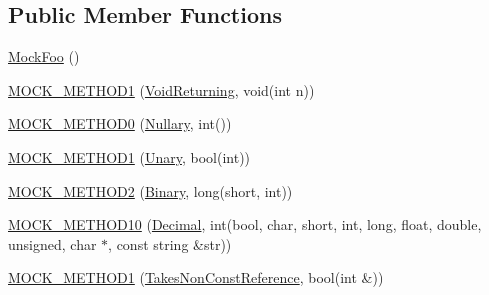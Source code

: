 \subsection*{Public Member Functions}
\begin{DoxyCompactItemize}
\item 
\hyperlink{classtesting_1_1gmock__generated__function__mockers__test_1_1_mock_foo_a05d4aeb00d75b5dbf627a5db2c0ada7f}{Mock\+Foo} ()
\item 
\hyperlink{classtesting_1_1gmock__generated__function__mockers__test_1_1_mock_foo_a03e7f723e9909b031fc6df22f41aac7f}{M\+O\+C\+K\+\_\+\+M\+E\+T\+H\+O\+D1} (\hyperlink{classtesting_1_1gmock__generated__function__mockers__test_1_1_foo_interface_adf968115cf1260004d8abe372dc71c85}{Void\+Returning}, void(int n))
\item 
\hyperlink{classtesting_1_1gmock__generated__function__mockers__test_1_1_mock_foo_a25b99ec3b994318b7ecb0578da113136}{M\+O\+C\+K\+\_\+\+M\+E\+T\+H\+O\+D0} (\hyperlink{classtesting_1_1gmock__generated__function__mockers__test_1_1_foo_interface_a633e753eafa7f82dde22ecf9492f341c}{Nullary}, int())
\item 
\hyperlink{classtesting_1_1gmock__generated__function__mockers__test_1_1_mock_foo_a9f9ce709a5b13e319eeb348e6eae3d18}{M\+O\+C\+K\+\_\+\+M\+E\+T\+H\+O\+D1} (\hyperlink{classtesting_1_1gmock__generated__function__mockers__test_1_1_foo_interface_ae0885ac29bc4a3f180f6573d8b1a341e}{Unary}, bool(int))
\item 
\hyperlink{classtesting_1_1gmock__generated__function__mockers__test_1_1_mock_foo_a50f8c94d6fab258d49e1d4a15ea7a7af}{M\+O\+C\+K\+\_\+\+M\+E\+T\+H\+O\+D2} (\hyperlink{classtesting_1_1gmock__generated__function__mockers__test_1_1_foo_interface_a59ea28b711ece054ce9d57c2dc574ba0}{Binary}, long(short, int))
\item 
\hyperlink{classtesting_1_1gmock__generated__function__mockers__test_1_1_mock_foo_aeb9b35bc4054018f6a80c811a58404e3}{M\+O\+C\+K\+\_\+\+M\+E\+T\+H\+O\+D10} (\hyperlink{classtesting_1_1gmock__generated__function__mockers__test_1_1_foo_interface_a5c5886880581d8dd420c9a187ff884b2}{Decimal}, int(bool, char, short, int, long, float, double, unsigned, char $\ast$, const string \&str))
\item 
\hyperlink{classtesting_1_1gmock__generated__function__mockers__test_1_1_mock_foo_a785cbef820189a974170cea52b0d97d9}{M\+O\+C\+K\+\_\+\+M\+E\+T\+H\+O\+D1} (\hyperlink{classtesting_1_1gmock__generated__function__mockers__test_1_1_foo_interface_a694354adfffcee58093298bc12182ff5}{Takes\+Non\+Const\+Reference}, bool(int \&))

\end{DoxyCompactItemize}
